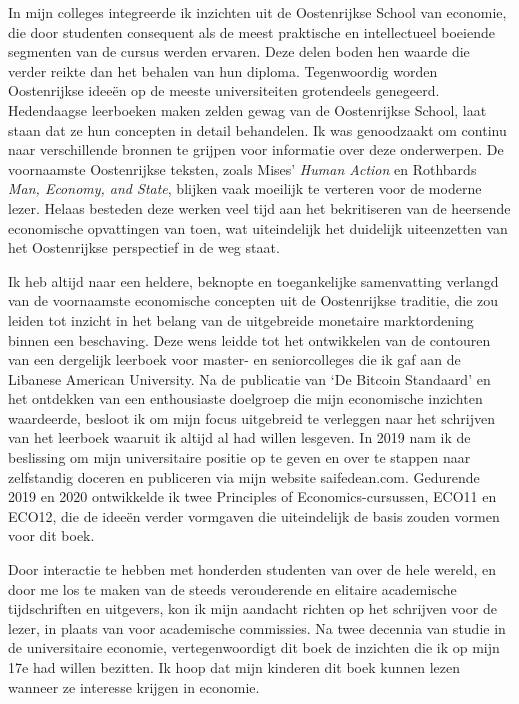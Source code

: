 In mijn colleges integreerde ik inzichten uit de Oostenrijkse School van economie, die door studenten consequent als de meest praktische en intellectueel boeiende segmenten van de cursus werden ervaren. Deze delen boden hen waarde die verder reikte dan het behalen van hun diploma. Tegenwoordig worden Oostenrijkse ideeën op de meeste universiteiten grotendeels genegeerd. Hedendaagse leerboeken maken zelden gewag van de Oostenrijkse School, laat staan dat ze hun concepten in detail behandelen. Ik was genoodzaakt om continu naar verschillende bronnen te grijpen voor informatie over deze onderwerpen. De voornaamste Oostenrijkse teksten, zoals Mises' \textit{Human Action} en Rothbards \textit{Man, Economy, and State}, blijken vaak moeilijk te verteren voor de moderne lezer. Helaas besteden deze werken veel tijd aan het bekritiseren van de heersende economische opvattingen van toen, wat uiteindelijk het duidelijk uiteenzetten van het Oostenrijkse perspectief in de weg staat.

Ik heb altijd naar een heldere, beknopte en toegankelijke samenvatting verlangd van de voornaamste economische concepten uit de Oostenrijkse traditie, die zou leiden tot inzicht in het belang van de uitgebreide monetaire marktordening binnen een beschaving. Deze wens leidde tot het ontwikkelen van de contouren van een dergelijk leerboek voor master- en seniorcolleges die ik gaf aan de Libanese American University. Na de publicatie van `De Bitcoin Standaard' en het ontdekken van een enthousiaste doelgroep die mijn economische inzichten waardeerde, besloot ik om mijn focus uitgebreid te verleggen naar het schrijven van het leerboek waaruit ik altijd al had willen lesgeven. In 2019 nam ik de beslissing om mijn universitaire positie op te geven en over te stappen naar zelfstandig doceren en publiceren via mijn website saifedean.com. Gedurende 2019 en 2020 ontwikkelde ik twee Principles of Economics-cursussen, ECO11 en ECO12, die de ideeën verder vormgaven die uiteindelijk de basis zouden vormen voor dit boek.

Door interactie te hebben met honderden studenten van over de hele wereld, en door me los te maken van de steeds verouderende en elitaire academische tijdschriften en uitgevers, kon ik mijn aandacht richten op het schrijven voor de lezer, in plaats van voor academische commissies. Na twee decennia van studie in de universitaire economie, vertegenwoordigt dit boek de inzichten die ik op mijn 17e had willen bezitten. Ik hoop dat mijn kinderen dit boek kunnen lezen wanneer ze interesse krijgen in economie.

